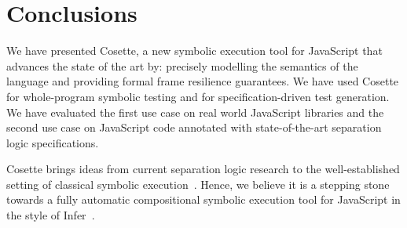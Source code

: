 \documentclass[sigconf, review]{acmart}
\newcommand{\cosette}{Cosette\xspace}
\newcommand{\myparagraph}[1]{\smallskip\noindent {\bf #1.}\hspace{1pt}}
\begin{document}
\section{Conclusions}

We have presented \cosette, a new symbolic execution tool for JavaScript that advances the 
state of the art by: 
 precisely modelling the semantics of the language and 
 providing formal frame resilience guarantees. 
We have used \cosette for whole-program symbolic testing and for specification-driven test generation. 
We have evaluated the first use case on real world JavaScript libraries and the second use case 
on JavaScript code annotated with state-of-the-art separation logic specifications.  

\cosette brings ideas from current separation logic research to the well-established 
setting of classical symbolic execution~\cite{andreasen:acmsurv:2017}. Hence, 
we believe it is a stepping stone towards a fully automatic compositional symbolic execution 
tool for JavaScript in the style of Infer~\cite{calcagno:nasa:2011}. 






%
\end{document}
